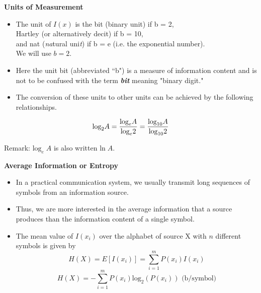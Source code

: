 \documentclass[a4]{beamer}
\begin{document}

\noindent \textbf{Units of Measurement}
\begin{itemize}
\item The unit of $I(x)$ is the bit (binary unit) if b = 2, \\ Hartley (or alternatively decit) if b = 10,\\ and nat (\emph{na}tural uni\emph{t}) if b = e (i.e. the exponential number).  \\ We will use $b = 2$. \item Here the unit bit (abbreviated ``b") is a measure of information content and is not to be confused with the term \emph{\textbf{bit}} meaning "binary digit." \item The conversion of these
units to other units can be achieved by the following relationships.
\end{itemize}

\[ \mbox{log}_2A = {\mbox{log}_e A \over \mbox{log} _e 2}   = {\mbox{log}_{10} A \over \mbox{log}_{10} 2}  \]

Remark: $ \mbox{log}_e\; A $ is also written $\mbox{ln}\; A$.



\noindent \textbf{Average Information or Entropy}
\begin{itemize}
\item In a practical communication system, we usually transmit long sequences of symbols from an
information source. \item Thus, we are more interested in the average information that a source produces
than the information content of a single symbol.
\item The mean value of $ I(x_i)$ over the alphabet of source X with $n$ different symbols is given by
\[ H(X) = E[I(x_i)] = \sum^m_{i=1} P(x_i)I(x_i) \]
\[ H(X) =  - \sum^m_{i=1} P(x_i)\mbox{log}_2( P(x_i) ) \mbox{        (b/symbol)}\]
\end{itemize}



\end{document}
